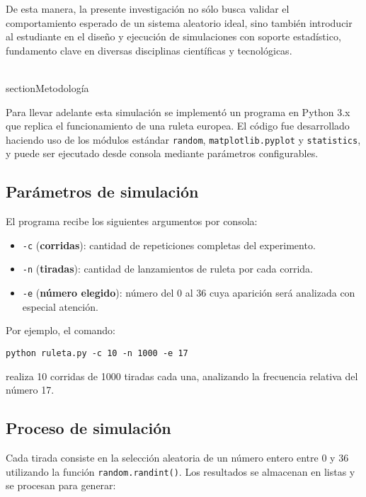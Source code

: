 \documentclass{article}
\begin{document}
De esta manera, la presente investigación no sólo busca validar el comportamiento esperado de un sistema aleatorio ideal, sino también introducir al estudiante en el diseño y ejecución de simulaciones con soporte estadístico, fundamento clave en diversas disciplinas científicas y tecnológicas.



\\section{Metodología}

Para llevar adelante esta simulación se implementó un programa en Python 3.x que replica el funcionamiento de una ruleta europea. El código fue desarrollado haciendo uso de los módulos estándar \texttt{random}, \texttt{matplotlib.pyplot} y \texttt{statistics}, y puede ser ejecutado desde consola mediante parámetros configurables.

\subsection{Parámetros de simulación}

El programa recibe los siguientes argumentos por consola:

\begin{itemize}
    \item \texttt{-c} (\textbf{corridas}): cantidad de repeticiones completas del experimento.
    \item \texttt{-n} (\textbf{tiradas}): cantidad de lanzamientos de ruleta por cada corrida.
    \item \texttt{-e} (\textbf{número elegido}): número del 0 al 36 cuya aparición será analizada con especial atención.
\end{itemize}

Por ejemplo, el comando:

\begin{center}
\texttt{python ruleta.py -c 10 -n 1000 -e 17}
\end{center}

realiza 10 corridas de 1000 tiradas cada una, analizando la frecuencia relativa del número 17.

\subsection{Proceso de simulación}

Cada tirada consiste en la selección aleatoria de un número entero entre 0 y 36 utilizando la función \texttt{random.randint()}. Los resultados se almacenan en listas y se procesan para generar:
\end{document}
